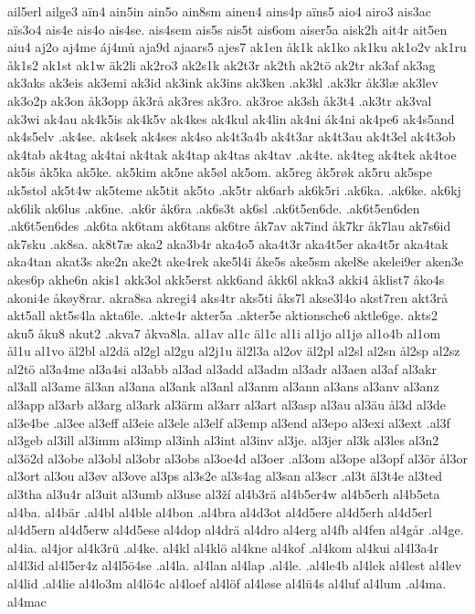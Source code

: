 ail5erl
ailge3
aïn4
ain5in
ain5o
ain8sm
ainen4
ains4p
aïns5
aio4
airo3
ais3ac
aïs3o4
ais4e
ais4o
ais4se.
ais4sem
ais5s
ais5t
ais6om
aiser5a
aisk2h
ait4r
ait5en
aiu4
aj2o
aj4me
áj4mů
aja9d
ajaars5
ajes7
ak1en
åk1k
ak1ko
ak1ku
ak1o2v
ak1ru
åk1s2
ak1st
ak1w
äk2li
ak2ro3
ak2s1k
ak2t3r
ak2th
ak2tö
ak2tr
ak3af
ak3ag
ak3aks
ak3eis
ak3emi
ak3id
ak3ink
ak3ins
ak3ken
.ak3kl
.ak3kr
åk3læ
ak3lev
ak3o2p
ak3on
åk3opp
åk3rå
ak3res
ak3ro.
ak3roe
ak3sh
åk3t4
.ak3tr
ak3val
ak3wi
ak4au
ak4k5is
ak4k5v
ak4kes
ak4kul
ak4lin
ak4ni
ák4ni
ak4pe6
ak4s5and
ak4s5elv
.ak4se.
ak4sek
ak4ses
ak4so
ak4t3a4b
ak4t3ar
ak4t3au
ak4t3el
ak4t3ob
ak4tab
ak4tag
ak4tai
ak4tak
ak4tap
ak4tas
ak4tav
.ak4te.
ak4teg
ak4tek
ak4toe
ak5is
åk5ka
ak5ke.
ak5kim
ak5ne
ak5øl
ak5om.
ak5reg
åk5røk
ak5ru
ak5spe
ak5stol
ak5t4w
ak5teme
ak5tit
ak5to
.ak5tr
ak6arb
ak6k5ri
.ak6ka.
.ak6ke.
ak6kj
ak6lik
ak6lus
.ak6ne.
.ak6r
åk6ra
.ak6s3t
ak6sl
.ak6t5en6de.
.ak6t5en6den
.ak6t5en6des
.ak6ta
ak6tam
ak6tans
ak6tre
åk7av
ak7ind
åk7kr
åk7lau
ak7s6id
ak7sku
.ak8sa.
ak8t7æ
aka2
aka3b4r
aka4o5
aka4t3r
aka4t5er
aka4t5r
aka4tak
aka4tan
akat3s
ake2n
ake2t
ake4rek
ake5l4i
åke5s
ake5sm
akel8e
akelei9er
aken3e
akes6p
akhe6n
akis1
akk3ol
akk5erst
akk6and
åkk6l
akka3
akki4
åklist7
åko4s
akoni4e
åkøy8rar.
akra8sa
akregi4
aks4tr
aks5ti
åks7l
akse3l4o
akst7ren
akt3rå
akt5all
akt5s4la
akta6le.
.akte4r
akter5a
.akter5e
aktionsche6
aktle6ge.
akts2
aku5
åku8
akut2
.akva7
åkva8la.
al1av
al1c
äl1c
al1i
al1jo
al1jø
al1o4b
al1om
ål1u
al1vo
äl2bl
al2dä
al2gl
al2gu
al2j1u
äl2l3a
al2ov
äl2pl
al2sl
al2sn
ål2sp
al2sz
al2tö
al3a4me
al3a4si
al3abb
al3ad
al3add
al3adm
al3adr
al3aen
al3af
al3akr
al3all
al3ame
äl3an
al3ana
al3ank
al3anl
al3anm
al3ann
al3ans
al3anv
al3anz
al3app
al3arb
al3arg
al3ark
al3ärm
al3arr
al3art
al3asp
al3au
al3äu
ål3d
al3de
al3e4be
.al3ee
al3eff
al3eie
al3ele
al3elf
al3emp
al3end
al3epo
al3exi
al3ext
.al3f
al3geb
al3ill
al3imm
al3imp
al3inh
al3int
al3inv
al3je.
al3jer
al3k
al3les
al3n2
al3ö2d
al3obe
al3obl
al3obr
al3obs
al3oe4d
al3oer
.al3om
al3ope
al3opf
al3ör
ål3or
al3ort
al3ou
al3øv
al3ove
al3ps
al3s2e
al3s4ag
al3san
al3scr
.al3t
äl3t4e
al3ted
al3tha
al3u4r
al3uit
al3umb
al3use
al3ží
al4b3rä
al4b5er4w
al4b5erh
al4b5eta
al4ba.
al4bär
.al4bl
al4ble
al4bon
.al4bra
al4d3ot
al4d5ere
al4d5erh
al4d5erl
al4d5ern
al4d5erw
al4d5ese
al4dop
al4drä
al4dro
al4erg
al4fb
al4fen
al4går
.al4ge.
al4ia.
al4jor
al4k3rü
.al4ke.
al4kl
al4klö
al4kne
al4kof
.al4kom
al4kui
al4l3a4r
al4l3id
al4l5er4z
al4l5ö4se
.al4la.
al4lan
al4lap
.al4le.
.al4le4b
al4lek
al4lest
al4lev
al4lid
.al4lie
al4lo3m
al4lö4c
al4loef
al4löf
al4løse
al4lü4s
al4luf
al4lum
.al4ma.
al4mac
